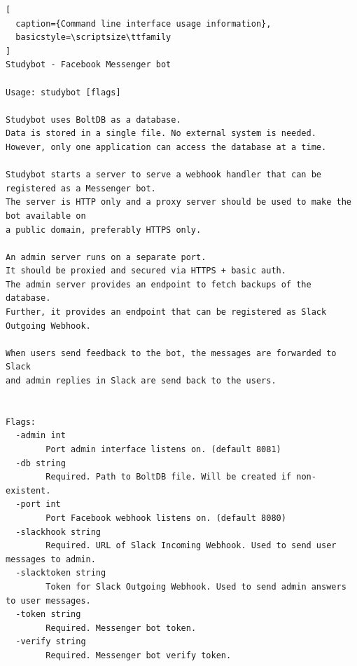 \begin{lstlisting}[
  caption={Command line interface usage information},
  basicstyle=\scriptsize\ttfamily
]
Studybot - Facebook Messenger bot

Usage: studybot [flags]

Studybot uses BoltDB as a database.
Data is stored in a single file. No external system is needed.
However, only one application can access the database at a time.

Studybot starts a server to serve a webhook handler that can be registered as a Messenger bot.
The server is HTTP only and a proxy server should be used to make the bot available on
a public domain, preferably HTTPS only.

An admin server runs on a separate port.
It should be proxied and secured via HTTPS + basic auth.
The admin server provides an endpoint to fetch backups of the database.
Further, it provides an endpoint that can be registered as Slack Outgoing Webhook.

When users send feedback to the bot, the messages are forwarded to Slack
and admin replies in Slack are send back to the users.


Flags:
  -admin int
    	Port admin interface listens on. (default 8081)
  -db string
    	Required. Path to BoltDB file. Will be created if non-existent.
  -port int
    	Port Facebook webhook listens on. (default 8080)
  -slackhook string
    	Required. URL of Slack Incoming Webhook. Used to send user messages to admin.
  -slacktoken string
    	Token for Slack Outgoing Webhook. Used to send admin answers to user messages.
  -token string
    	Required. Messenger bot token.
  -verify string
    	Required. Messenger bot verify token.
\end{lstlisting}


